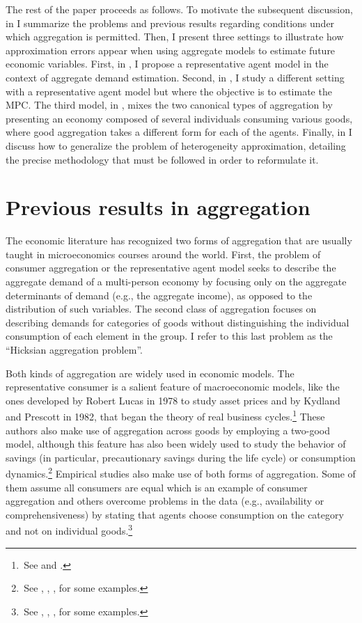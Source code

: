 \documentclass[english, a4paper, 12pt]{article}
\begin{document}
The rest of the paper proceeds as follows. To motivate the subsequent discussion, in  I summarize the problems and previous results regarding conditions under which aggregation is permitted. Then, I present three settings to illustrate how approximation errors appear when using aggregate models to estimate future economic variables. First, in , I propose a representative agent model in the context of aggregate demand estimation. Second, in , I study a different setting with a representative agent model but where the objective is to estimate the MPC. The third model, in , mixes the two canonical types of aggregation by presenting an economy composed of several individuals consuming various goods, where good aggregation takes a different form for each of the agents. Finally, in  I discuss how to generalize the problem of heterogeneity approximation, detailing the precise methodology that must be followed in order to reformulate it.

\section{Previous results in aggregation} \label{sec:PrevResults}
The economic literature has recognized two forms of aggregation that are usually taught in microeconomics courses around the world. First, the problem of consumer aggregation or the representative agent model seeks to describe the aggregate demand of a multi-person economy by focusing only on the aggregate determinants of demand (e.g., the aggregate income), as opposed to the distribution of such variables. The second class of aggregation focuses on describing demands for categories of goods without distinguishing the individual consumption of each element in the group. I refer to this last problem as the ``Hicksian aggregation problem''.

Both kinds of aggregation are widely used in economic models. The representative consumer is a salient feature of macroeconomic models, like the ones developed by Robert Lucas in 1978 to study asset prices and by Kydland and Prescott in 1982, that began the theory of real business cycles.\footnote{\,See \cite{Lucas78} and \cite{KyPr82}.} These authors also make use of aggregation across goods by employing a two-good model, although this feature has also been widely used to study the behavior of savings (in particular, precautionary savings during the life cycle) or consumption dynamics.\footnote{\,See \cite{Carroll92}, \cite{GourinchasParker02}, \cite{GulPesendorfer04}, \cite{ParkerPreston05} for some examples.} Empirical studies also make use of both forms of aggregation. Some of them assume all consumers are equal which is an example of consumer aggregation and others overcome problems in the data (e.g., availability or comprehensiveness) by stating that agents choose consumption on the category and not on individual goods.\footnote{\,See \cite{KaplanViolante14}, \cite{BergerVavra15}, \cite{KanPengWang17}, \cite{FagerengGuisoPistaferri17} for some examples.}
\end{document}
